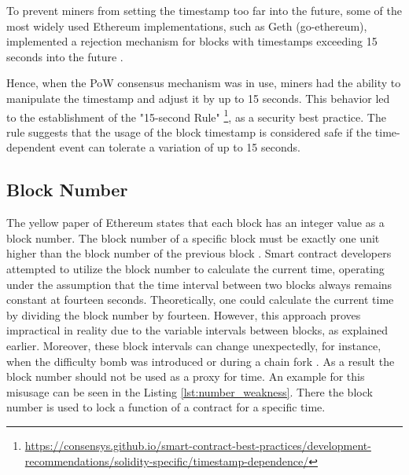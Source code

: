 %

To prevent miners from setting the timestamp too far into the future, some of the most widely used Ethereum implementations, such as Geth (go-ethereum), implemented a rejection mechanism for blocks with timestamps exceeding 15 seconds into the future \cite{go-ethereum-15-sek-limit}.

Hence, when the PoW consensus mechanism was in use, miners had the ability to
manipulate the timestamp and adjust it by up to 15 seconds. This behavior led
to the establishment of the "15-second Rule"
\footnote{\url{https://consensys.github.io/smart-contract-best-practices/development-recommendations/solidity-specific/timestamp-dependence/}},
as a security best practice. The
rule suggests that the usage of the block timestamp is considered
safe if the time-dependent event can tolerate a variation of up to 15 seconds. 

\subsection{Block Number}
The yellow paper of Ethereum states that each block has
an integer value as a block number. The block number
of a specific block must be exactly one unit higher than the block
number of the previous block \cite{ethyellowpaper2023}.
Smart contract developers attempted to utilize the block number to calculate
the current time, operating under the assumption that the time interval between
two blocks always remains constant at fourteen seconds. Theoretically, one could
calculate the current time by dividing the block number by fourteen.
However, this approach proves impractical in reality due to the variable
intervals between blocks, as explained earlier. Moreover, these block intervals
can change unexpectedly, for instance, when the difficulty bomb was introduced
or during a chain fork \cite{swc116}.
As a result the block number should not be used as a proxy for time.
An example for this misusage can be seen in the Listing \ref{lst:number_weakness}.
There the block number is used to lock a function of a contract for a specific time.

